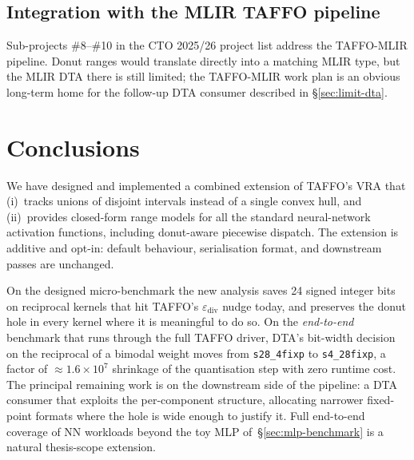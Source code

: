 \documentclass[11pt,a4paper]{article}
\theoremstyle{plain}
\begin{document}
\subsection{Integration with the MLIR TAFFO pipeline}

Sub-projects \#8--\#10 in the CTO 2025/26 project list address the
TAFFO-MLIR pipeline. Donut ranges would translate directly into a
matching MLIR type, but the MLIR DTA there is still limited; the
TAFFO-MLIR work plan is an obvious long-term home for the follow-up
DTA consumer described in \S\ref{sec:limit-dta}.

\section{Conclusions}
\label{sec:conclusions}

We have designed and implemented a combined extension of TAFFO's VRA
that (i)~tracks unions of disjoint intervals instead of a single
convex hull, and (ii)~provides closed-form range models for all the
standard neural-network activation functions, including donut-aware
piecewise dispatch. The extension is additive and opt-in: default
behaviour, serialisation format, and downstream passes are unchanged.

On the designed micro-benchmark the new analysis saves 24 signed
integer bits on reciprocal kernels that hit TAFFO's
$\varepsilon_{\text{div}}$ nudge today, and preserves the donut hole
in every kernel where it is meaningful to do so. On the
\emph{end-to-end} benchmark that runs through the full TAFFO driver,
DTA's bit-width decision on the reciprocal of a bimodal weight moves
from \texttt{s28\_4fixp} to \texttt{s4\_28fixp}, a factor of
$\approx 1.6 \times 10^{7}$ shrinkage of the quantisation step with
zero runtime cost. The principal remaining work is on the
downstream side of the pipeline: a DTA consumer that exploits the
per-component structure, allocating narrower fixed-point formats
where the hole is wide enough to justify it. Full end-to-end
coverage of NN workloads beyond the toy MLP of~\S\ref{sec:mlp-benchmark}
is a natural thesis-scope extension.
\end{document}
